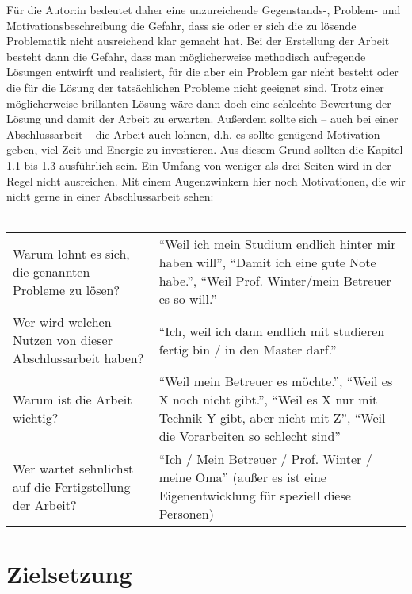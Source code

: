 Für die Autor:in bedeutet daher eine unzureichende Gegenstands-, Problem- und Motivationsbeschreibung die Gefahr, dass sie oder er sich die zu lösende Problematik nicht ausreichend klar gemacht hat.
Bei der Erstellung der Arbeit besteht dann die Gefahr, dass man möglicherweise methodisch aufregende Lösungen entwirft und realisiert, für die aber ein Problem gar nicht besteht oder die für die Lösung der tatsächlichen Probleme nicht geeignet sind.
Trotz einer möglicherweise brillanten Lösung wäre dann doch eine schlechte Bewertung der Lösung und damit der Arbeit zu erwarten.
Außerdem sollte sich -- auch bei einer Abschlussarbeit -- die Arbeit auch lohnen, d.h. es sollte genügend Motivation geben, viel Zeit und Energie zu investieren.
Aus diesem Grund sollten die Kapitel 1.1 bis 1.3 ausführlich sein.
Ein Umfang von weniger als drei Seiten wird in der Regel nicht ausreichen.
Mit einem Augenzwinkern hier noch Motivationen, die wir nicht gerne in einer Abschlussarbeit sehen:\\
~~\\

\begin{tabulary}{\textwidth}{LL}
Warum lohnt es sich, die genannten Probleme zu lösen?						&\enquote{Weil ich mein Studium endlich hinter mir haben will}, \enquote{Damit ich eine gute Note habe.}, \enquote{Weil Prof. Winter/mein Betreuer es so will.}\\
Wer wird welchen Nutzen von dieser Abschlussarbeit haben?					&\enquote{Ich, weil ich dann endlich mit studieren fertig bin / in den Master darf.}\\
Warum ist die Arbeit wichtig?												&\enquote{Weil mein Betreuer es möchte.}, \enquote{Weil es X noch nicht gibt.}, \enquote{Weil es X nur mit Technik Y gibt, aber nicht mit Z}, \enquote{Weil die Vorarbeiten so schlecht sind}\\
Wer wartet sehnlichst auf die Fertigstellung der Arbeit?					&\enquote{Ich / Mein Betreuer / Prof. Winter / meine Oma} (außer es ist eine Eigenentwicklung für speziell diese Personen)\\
\end{tabulary}

\section{Zielsetzung}\label{sec:zielsetzung}


